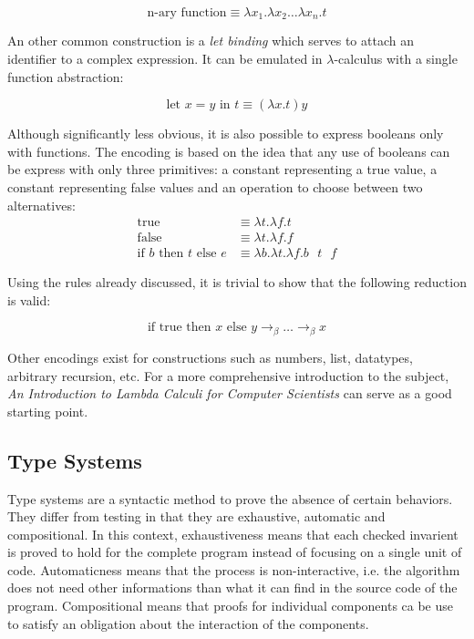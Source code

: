 \begin{displaymath}
  \text{n-ary function} \equiv \lambda x_1. \lambda x_2 \dots \lambda x_n. t
\end{displaymath}

An other common construction is a \emph{let binding} which serves to attach an identifier to a
complex expression. It can be emulated in $\lambda$-calculus with a single function abstraction:

\begin{displaymath}
  \text{let } x = y \text{ in } t \equiv (\lambda x. t) y
\end{displaymath}

Although significantly less obvious, it is also possible to express booleans only with functions.
The encoding is based on the idea that any use of booleans can be express with only three
primitives: a constant representing a true value, a constant representing false values and an
operation to choose between two alternatives:
\begin{align*}
  \text{true}
    & \equiv \lambda t. \lambda f. t \\
  \text{false}
    & \equiv \lambda t. \lambda f. f \\
  \text{if } b \text{ then } t \text{ else } e
    & \equiv \lambda b. \lambda t. \lambda f. b \text{ } t \text{ } f
\end{align*}

Using the rules already discussed, it is trivial to show that the following reduction is valid:

\begin{displaymath}
  \text{if true then } x \text{ else } y \to_\beta \dots \to_\beta x
\end{displaymath}

Other encodings exist for constructions such as numbers, list, datatypes, arbitrary recursion, etc.
For a more comprehensive introduction to the subject, \emph{An Introduction to Lambda Calculi for
Computer Scientists} \cite{hankin-2004-ILCCS} can serve as a good starting point.


\subsection{Type Systems}

Type systems are a syntactic method to prove the absence of certain behaviors. They differ from
testing in that they are exhaustive, automatic and compositional. In this context, exhaustiveness
means that each checked invarient is proved to hold for the complete program instead of focusing on
a single unit of code. Automaticness means that the process is non-interactive, i.e. the algorithm
does not need other informations than what it can find in the source code of the program.
Compositional means that proofs for individual components ca be use to satisfy an obligation about
the interaction of the components.

